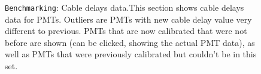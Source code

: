 \documentclass[12pt]{article}
\begin{document}
\begin{figure}
\centering
\noindent{}
  \caption{\centering \texttt{Benchmarking}: Cable delays data.\hspace{\textwidth}This section shows cable delays data for PMTs. Outliers are PMTs with new cable delay value very different to previous. PMTs that are now calibrated that were not before are shown (can be clicked, showing the actual PMT data), as well as PMTs that were previously calibrated but couldn't be in this set.}
  \label{fig:bench2}
\end{figure}
\end{document}

